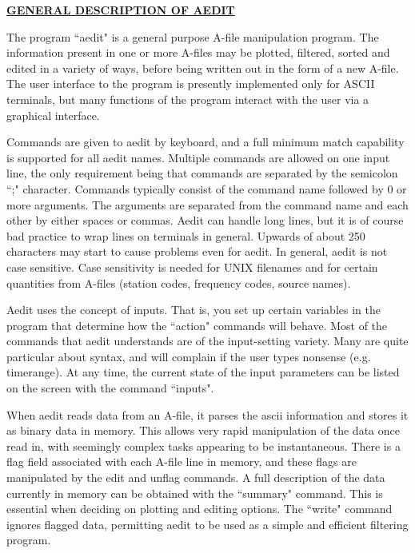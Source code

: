 \begin{center}
\Large\bf
\underline{GENERAL DESCRIPTION OF AEDIT}
\end{center}

The program ``aedit" is a general purpose A-file manipulation
program.  The information present in one or more A-files may
be plotted, filtered, sorted and edited in a variety of ways, 
before being written out in the form of a new A-file.  The user
interface to the program is presently implemented only for
ASCII terminals, but many functions of the program interact
with the user via a graphical interface.

Commands are given to aedit by keyboard, and a full minimum
match capability is supported for all aedit names.  Multiple
commands are allowed on one input line, the only requirement
being that commands are separated by the semicolon ``;" 
character.  Commands typically consist of the command name
followed by 0 or more arguments.  The arguments are separated
from the command name and each other by either spaces or
commas.  Aedit can handle long lines, but it is of course bad
practice to wrap lines on terminals in general.  Upwards of
about 250 characters may start to cause problems even for aedit.
In general, aedit is not case sensitive.  Case sensitivity
is needed for UNIX filenames and for certain quantities from 
A-files (station codes, frequency codes, source names).

Aedit uses the concept of inputs.  That is, you set up
certain variables in the program that determine how the ``action"
commands will behave.  Most of the commands that aedit
understands are of the input-setting variety.  Many are quite
particular about syntax, and will complain if the user types
nonsense (e.g. timerange).  At any time, the current state of
the input parameters can be listed on the screen with the
command ``inputs".

When aedit reads data from an A-file, it parses the ascii
information and stores it as binary data in memory.  This allows
very rapid manipulation of the data once read in, with
seemingly complex tasks appearing to be instantaneous.  There
is a flag field associated with each A-file line in memory,
and these flags are manipulated by the edit and unflag commands.
A full description of the data currently in memory can be
obtained with the ``summary" command.  This is essential when
deciding on plotting and editing options.  The ``write" command
ignores flagged data, permitting aedit to be used as a simple
and efficient filtering program.

